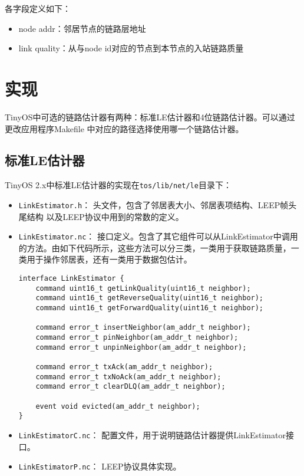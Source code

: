     各字段定义如下：
\vspace{-10pt}
\begin{itemize}
	\item node addr：邻居节点的链路层地址
	\item link quality：从与node id对应的节点到本节点的入站链路质量
\end{itemize}

\section{实现}
  TinyOS中可选的链路估计器有两种：标准LE估计器和4位链路估计器。可以通过更改应用程序Makefile
中对应的路径选择使用哪一个链路估计器。
  \subsection{标准LE估计器}
  TinyOS 2.x中标准LE估计器的实现在\texttt{tos/lib/net/le}目录下：
\vspace{-10pt}
\begin{itemize}
  \item {\texttt{LinkEstimator.h}}：	头文件，包含了邻居表大小、邻居表项结构、LEEP帧头尾结构
  			以及LEEP协议中用到的常数的定义。
  \item {\texttt{LinkEstimator.nc}}：	接口定义。包含了其它组件可以从LinkEstimator中调用的方法。由如下代码所示，这些方法可以分三类，一类用于获取链路质量，一类用于操作邻居表，还有一类用于数据包估计。

\begin{lstlisting}
interface LinkEstimator {
	command uint16_t getLinkQuality(uint16_t neighbor);
	command uint16_t getReverseQuality(uint16_t neighbor);
	command uint16_t getForwardQuality(uint16_t neighbor);

	command error_t insertNeighbor(am_addr_t neighbor);
	command error_t pinNeighbor(am_addr_t neighbor);
	command error_t unpinNeighbor(am_addr_t neighbor);

	command error_t txAck(am_addr_t neighbor);
	command error_t txNoAck(am_addr_t neighbor);
	command error_t clearDLQ(am_addr_t neighbor);

	event void evicted(am_addr_t neighbor);
}
\end{lstlisting}
  \item {\texttt{LinkEstimatorC.nc}}：	配置文件，用于说明链路估计器提供LinkEstimator接口。
  \item {\texttt{LinkEstimatorP.nc}}：	LEEP协议具体实现。
\end{itemize}
\vspace{-10pt}
  
